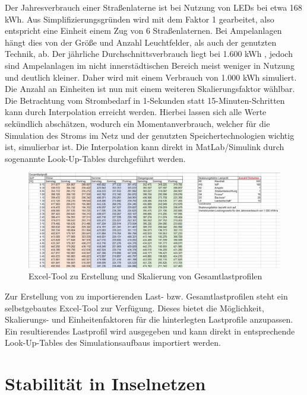 Der Jahresverbrauch einer Straßenlaterne ist bei Nutzung von LEDs bei etwa 168 kWh. 
Aus Simplifizierungsgründen wird mit dem Faktor 1 gearbeitet, also entspricht eine Einheit einem Zug von 6 Straßenlaternen. 
Bei Ampelanlagen hängt dies von der Größe und Anzahl Leuchtfelder, als auch der genutzten Technik, ab. 
Der jährliche Durchschnittsverbrauch liegt bei 1.600 kWh , jedoch sind Ampelanlagen im nicht innerstädtischen Bereich meist weniger in Nutzung und deutlich kleiner. 
Daher wird mit einem Verbrauch von 1.000 kWh simuliert. Die Anzahl an Einheiten ist nun mit einem weiteren Skalierungsfaktor wählbar.
Die Betrachtung vom Strombedarf in 1-Sekunden statt 15-Minuten-Schritten kann durch Interpolation erreicht werden. 
Hierbei lassen sich alle Werte sekündlich abschätzen, wodurch ein Momentanverbrauch, welcher für die Simulation des Stroms im Netz und der genutzten Speichertechnologien wichtig ist, simulierbar ist. 
Die Interpolation kann direkt in MatLab/Simulink durch sogenannte Look-Up-Tables durchgeführt werden.
 
\begin{figure}[h!]
    \centering
    \includegraphics[width=14cm]{Abbildungen/VerbraucherAbb4.jpg}
    \caption{Excel-Tool zu Erstellung und Skalierung von Gesamtlastprofilen}\label{fig:Excel-Tool_zu_Erstellung_und_Skalierung_von_Gesamtlastprofilen}
\end{figure}

Zur Erstellung von zu importierenden Last- bzw. Gesamtlastprofilen steht ein selbstgebautes Excel-Tool zur Verfügung. 
Dieses bietet die Möglichkeit, Skalierungs- und Einheitenfaktoren für die hinterlegten Lastprofile anzupassen. 
Ein resultierendes Lastprofil wird ausgegeben und kann direkt in entsprechende Look-Up-Tables des Simulationsaufbaus importiert werden.

\section{Stabilität in Inselnetzen}

